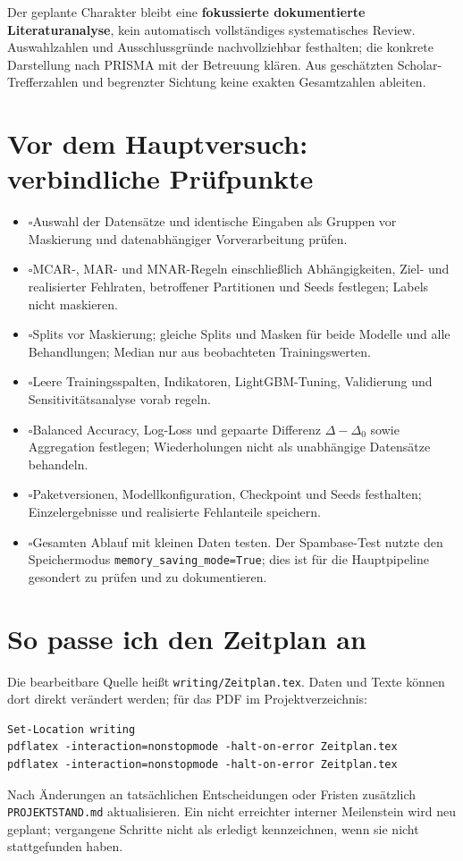\documentclass[11pt,a4paper]{article}
\newcommand{\todoitem}{\(\square\)\enspace}
\begin{document}
Der geplante Charakter bleibt eine \textbf{fokussierte dokumentierte
Literaturanalyse}, kein automatisch vollständiges systematisches Review.
Auswahlzahlen und Ausschlussgründe nachvollziehbar festhalten; die konkrete
Darstellung nach PRISMA mit der Betreuung klären. Aus geschätzten Scholar-
Trefferzahlen und begrenzter Sichtung keine exakten Gesamtzahlen ableiten.

\section{Vor dem Hauptversuch: verbindliche Prüfpunkte}

\begin{itemize}
  \item \todoitem Auswahl der Datensätze und identische Eingaben als Gruppen
  vor Maskierung und datenabhängiger Vorverarbeitung prüfen.
  \item \todoitem MCAR-, MAR- und MNAR-Regeln einschließlich Abhängigkeiten,
  Ziel- und realisierter Fehlraten, betroffener Partitionen und Seeds
  festlegen; Labels nicht maskieren.
  \item \todoitem Splits vor Maskierung; gleiche Splits und Masken für beide
  Modelle und alle Behandlungen; Median nur aus beobachteten Trainingswerten.
  \item \todoitem Leere Trainingsspalten, Indikatoren, LightGBM-Tuning,
  Validierung und Sensitivitätsanalyse vorab regeln.
  \item \todoitem Balanced Accuracy, Log-Loss und gepaarte Differenz
  \(\Delta-\Delta_0\) sowie Aggregation festlegen; Wiederholungen nicht als
  unabhängige Datensätze behandeln.
  \item \todoitem Paketversionen, Modellkonfiguration, Checkpoint und Seeds
  festhalten; Einzelergebnisse und realisierte Fehlanteile speichern.
  \item \todoitem Gesamten Ablauf mit kleinen Daten testen. Der Spambase-Test
  nutzte den Speichermodus \texttt{memory\_saving\_mode=True}; dies ist für die Hauptpipeline
  gesondert zu prüfen und zu dokumentieren.
\end{itemize}

\section{So passe ich den Zeitplan an}

Die bearbeitbare Quelle heißt \texttt{writing/Zeitplan.tex}. Daten und Texte
können dort direkt verändert werden; für das PDF im Projektverzeichnis:

\begin{verbatim}
Set-Location writing
pdflatex -interaction=nonstopmode -halt-on-error Zeitplan.tex
pdflatex -interaction=nonstopmode -halt-on-error Zeitplan.tex
\end{verbatim}

Nach Änderungen an tatsächlichen Entscheidungen oder Fristen zusätzlich
\texttt{PROJEKTSTAND.md} aktualisieren. Ein nicht erreichter interner
Meilenstein wird neu geplant; vergangene Schritte nicht als erledigt
kennzeichnen, wenn sie nicht stattgefunden haben.
\end{document}
